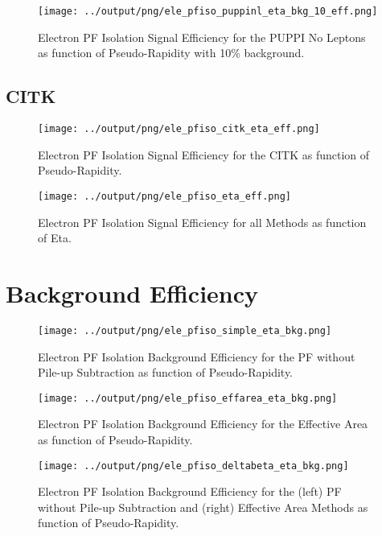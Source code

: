 \documentclass[11pt]{book}
\begin{document}
\begin{figure}[htb]
\centering
\texttt{[image: ../output/png/ele\_pfiso\_puppinl\_eta\_bkg\_10\_eff.png]}
\caption{Electron PF Isolation Signal Efficiency for the PUPPI No Leptons as function of Pseudo-Rapidity with 10\% background.}
\label{fig:ele_pfiso_eta_bkg_puppinl_bkg_10_eff}
\end{figure}
\clearpage

\section{CITK}
\begin{figure}[htb]
\centering
\texttt{[image: ../output/png/ele\_pfiso\_citk\_eta\_eff.png]}
\caption{Electron PF Isolation Signal Efficiency for the CITK as function of Pseudo-Rapidity.}
\label{fig:ele_pfiso_eta_eff_citk}
\end{figure}

\begin{figure}[htb]
\centering
\texttt{[image: ../output/png/ele\_pfiso\_eta\_eff.png]}
\caption{Electron PF Isolation Signal Efficiency for all Methods as function of Eta.}
\label{fig:ele_pfiso_eta_eff}
\end{figure}
\clearpage

\chapter{Background Efficiency}
\begin{figure}[htb]
\centering
\texttt{[image: ../output/png/ele\_pfiso\_simple\_eta\_bkg.png]}
\caption{Electron PF Isolation Background Efficiency for the PF without Pile-up Subtraction as function of Pseudo-Rapidity.}
\label{fig:ele_pfiso_eta_bkg_simple}
\end{figure}

\begin{figure}[htb]
\centering
\texttt{[image: ../output/png/ele\_pfiso\_effarea\_eta\_bkg.png]}
\caption{Electron PF Isolation Background Efficiency for the Effective Area as function of Pseudo-Rapidity.}
\label{fig:ele_pfiso_eta_bkg_effarea}
\end{figure}

\begin{figure}[htb]
\centering
\texttt{[image: ../output/png/ele\_pfiso\_deltabeta\_eta\_bkg.png]}
\caption{Electron PF Isolation Background Efficiency for the (left) PF without Pile-up Subtraction and (right) Effective Area Methods as function of Pseudo-Rapidity.}
\label{fig:ele_pfiso_eta_bkg_deltabeta}
\end{figure}
\end{document}
